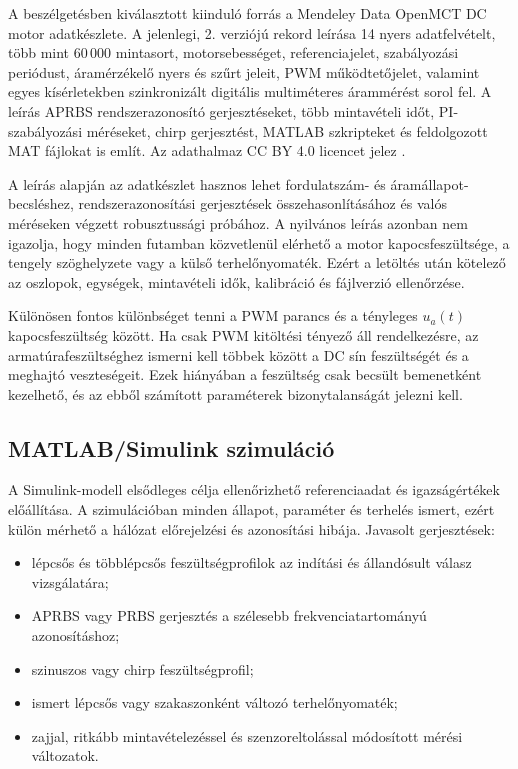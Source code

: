 \documentclass[11pt,a4paper]{article}
\begin{document}
A beszélgetésben kiválasztott kiinduló forrás a Mendeley Data OpenMCT DC motor adatkészlete. A jelenlegi, 2. verziójú rekord leírása 14 nyers adatfelvételt, több mint 60\,000 mintasort, motorsebességet, referenciajelet, szabályozási periódust, áramérzékelő nyers és szűrt jeleit, PWM működtetőjelet, valamint egyes kísérletekben szinkronizált digitális multiméteres árammérést sorol fel. A leírás APRBS rendszerazonosító gerjesztéseket, több mintavételi időt, PI-szabályozási méréseket, chirp gerjesztést, MATLAB szkripteket és feldolgozott MAT fájlokat is említ. Az adathalmaz CC BY 4.0 licencet jelez \cite{mendeley}.

A leírás alapján az adatkészlet hasznos lehet fordulatszám- és áramállapot-becsléshez, rendszerazonosítási gerjesztések összehasonlításához és valós méréseken végzett robusztussági próbához. A nyilvános leírás azonban nem igazolja, hogy minden futamban közvetlenül elérhető a motor kapocsfeszültsége, a tengely szöghelyzete vagy a külső terhelőnyomaték. Ezért a letöltés után kötelező az oszlopok, egységek, mintavételi idők, kalibráció és fájlverzió ellenőrzése.

Különösen fontos különbséget tenni a PWM parancs és a tényleges $u_a(t)$ kapocsfeszültség között. Ha csak PWM kitöltési tényező áll rendelkezésre, az armatúrafeszültséghez ismerni kell többek között a DC sín feszültségét és a meghajtó veszteségeit. Ezek hiányában a feszültség csak becsült bemenetként kezelhető, és az ebből számított paraméterek bizonytalanságát jelezni kell.

\subsection{MATLAB/Simulink szimuláció}

A Simulink-modell elsődleges célja ellenőrizhető referenciaadat és igazságértékek előállítása. A szimulációban minden állapot, paraméter és terhelés ismert, ezért külön mérhető a hálózat előrejelzési és azonosítási hibája. Javasolt gerjesztések:

\begin{itemize}
  \item lépcsős és többlépcsős feszültségprofilok az indítási és állandósult válasz vizsgálatára;
  \item APRBS vagy PRBS gerjesztés a szélesebb frekvenciatartományú azonosításhoz;
  \item szinuszos vagy chirp feszültségprofil;
  \item ismert lépcsős vagy szakaszonként változó terhelőnyomaték;
  \item zajjal, ritkább mintavételezéssel és szenzoreltolással módosított mérési változatok.
\end{itemize}
\end{document}
